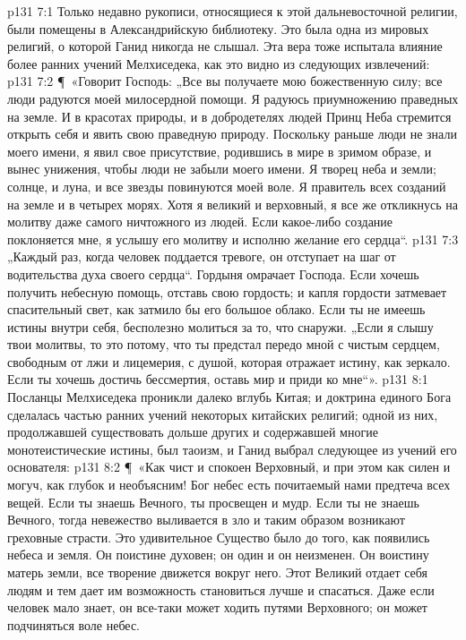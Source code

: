 \vs p131 7:1 Только недавно рукописи, относящиеся к этой дальневосточной религии, были помещены в Александрийскую библиотеку. Это была одна из мировых религий, о которой Ганид никогда не слышал. Эта вера тоже испытала влияние более ранних учений Мелхиседека, как это видно из следующих извлечений:
\vs p131 7:2 \P\ «Говорит Господь: „Все вы получаете мою божественную силу; все люди радуются моей милосердной помощи. Я радуюсь приумножению праведных на земле. И в красотах природы, и в добродетелях людей Принц Неба стремится открыть себя и явить свою праведную природу. Поскольку раньше люди не знали моего имени, я явил свое присутствие, родившись в мире в зримом образе, и вынес унижения, чтобы люди не забыли моего имени. Я творец неба и земли; солнце, и луна, и все звезды повинуются моей воле. Я правитель всех созданий на земле и в четырех морях. Хотя я великий и верховный, я все же откликнусь на молитву даже самого ничтожного из людей. Если какое\hyp{}либо создание поклоняется мне, я услышу его молитву и исполню желание его сердца“.
\vs p131 7:3 „Каждый раз, когда человек поддается тревоге, он отступает на шаг от водительства духа своего сердца“. Гордыня омрачает Господа. Если хочешь получить небесную помощь, отставь свою гордость; и капля гордости затмевает спасительный свет, как затмило бы его большое облако. Если ты не имеешь истины внутри себя, бесполезно молиться за то, что снаружи. „Если я слышу твои молитвы, то это потому, что ты предстал передо мной с чистым сердцем, свободным от лжи и лицемерия, с душой, которая отражает истину, как зеркало. Если ты хочешь достичь бессмертия, оставь мир и приди ко мне“».
\vs p131 8:1 Посланцы Мелхиседека проникли далеко вглубь Китая; и доктрина единого Бога сделалась частью ранних учений некоторых китайских религий; одной из них, продолжавшей существовать дольше других и содержавшей многие монотеистические истины, был таоизм, и Ганид выбрал следующее из учений его основателя:
\vs p131 8:2 \P\ «Как чист и спокоен Верховный, и при этом как силен и могуч, как глубок и необъясним! Бог небес есть почитаемый нами предтеча всех вещей. Если ты знаешь Вечного, ты просвещен и мудр. Если ты не знаешь Вечного, тогда невежество выливается в зло и таким образом возникают греховные страсти. Это удивительное Существо было до того, как появились небеса и земля. Он поистине духовен; он один и он неизменен. Он воистину матерь земли, все творение движется вокруг него. Этот Великий отдает себя людям и тем дает им возможность становиться лучше и спасаться. Даже если человек мало знает, он все\hyp{}таки может ходить путями Верховного; он может подчиняться воле небес.
